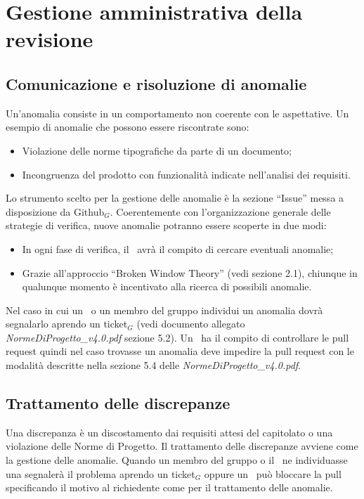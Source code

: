 \section{Gestione amministrativa della revisione}
\subsection{Comunicazione e risoluzione di anomalie}
Un'anomalia consiste in un comportamento non coerente con le aspettative. Un esempio di anomalie che possono essere riscontrate sono:
\begin{itemize}
	\item Violazione delle norme tipografiche da parte di un documento;
	\item Incongruenza del prodotto con funzionalità indicate nell'analisi dei requisiti.
\end{itemize}
Lo strumento scelto per la gestione delle anomalie è la sezione ``Issue'' messa a disposizione da Github$_G$. Coerentemente con l'organizzazione generale delle strategie di verifica, nuove anomalie potranno essere scoperte in due modi:

\begin{itemize}
	\item In ogni fase di verifica, il \ruoloVerificatore\ avrà il compito di cercare eventuali anomalie;
	\item Grazie all'approccio ``Broken Window Theory'' (vedi sezione 2.1), chiunque in qualunque momento è incentivato alla ricerca di possibili anomalie.
\end{itemize}
Nel caso in cui un \ruoloVerificatore\ o un membro del gruppo individui un anomalia dovrà segnalarlo aprendo un ticket$_G$ (vedi documento allegato \textit{NormeDiProgetto\_v4.0.pdf} sezione 5.2). Un \ruoloVerificatore\ ha il compito di controllare le pull request quindi nel caso trovasse un anomalia deve impedire la pull request con le modalità descritte nella sezione 5.4 delle \textit{NormeDiProgetto\_v4.0.pdf}.

\subsection{Trattamento delle discrepanze}
Una discrepanza è un discostamento dai requisiti attesi del capitolato o una violazione delle Norme di Progetto. Il trattamento delle discrepanze avviene come la gestione delle anomalie. Quando un membro del gruppo o il \ruoloVerificatore\ ne individuasse una segnalerà il problema aprendo un ticket$_G$ oppure un \ruoloVerificatore\ può bloccare la pull specificando il motivo al richiedente come per il trattamento delle anomalie.
\newpage\right 
